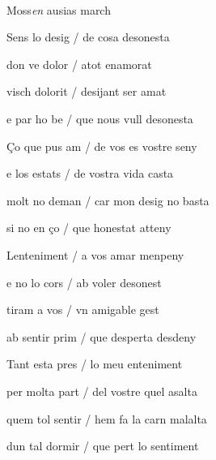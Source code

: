 \documentclass[12pt]{article}
\renewcommand{\espaiAbansEtiquetaPoema}{\vspace{0ex}}
\begin{document}
\begin{estrofa}

\espaiAbansEtiquetaPoema

\\

\begin{rubrica}

\pagina{[160v]} Moss\textit{en} ausias march

\end{rubrica}

\end{estrofa}


\begin{estrofa}

 Sens lo desig / de cosa desonesta

 don ve dolor / atot enamorat

 visch dolorit / desijant ser amat

 e par ho be / que nous vull desonesta

 \c{C}o que pus am / de vos es vostre seny

 e los estats / de vostra vida casta

 molt no deman / car mon desig no basta

 si no en \c{c}o / que honestat atteny

\end{estrofa}



\begin{estrofa}

 Lenteniment / a vos amar menpeny

 e no lo cors / ab voler desonest

 tiram a vos / vn amigable gest

 ab sentir prim / que desperta desdeny

 Tant esta pres / lo meu enteniment

 per molta part / del vostre quel asalta

 quem tol sentir / hem fa la carn malalta

 dun tal dormir / que pert lo sentiment

\end{estrofa}
\end{document}
